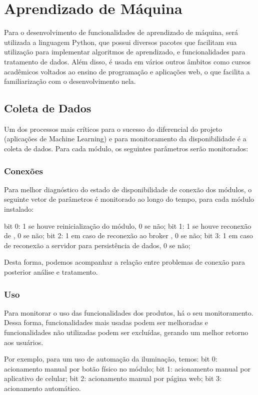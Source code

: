 \chapter{Aprendizado de Máquina}

Para o desenvolvimento de funcionalidades de aprendizado de máquina, será utilizada a linguagem Python, que possui diversos pacotes que facilitam sua utilização para implementar algoritmos de aprendizado, e funcionalidades para tratamento de dados. Além disso, é usada em vários outros âmbitos como cursos acadêmicos voltados ao ensino de programação e aplicações web, o que facilita a familiarização com o desenvolvimento nela.

\section{Coleta de Dados}
Um dos processos mais críticos para o sucesso do diferencial do projeto (aplicações de Machine Learning) e para monitoramento da disponibilidade é a coleta de dados. Para cada módulo, os seguintes parâmetros serão monitorados:

\subsection{Conexões}
Para melhor diagnóstico do estado de disponibilidade de conexão dos módulos, o seguinte vetor de parâmetros é monitorado ao longo do tempo, para cada módulo instalado:

bit 0: 1 se houve reinicialização do módulo, 0 se não;
bit 1: 1 se houve reconexão de \wwifi, 0 se não;
bit 2: 1 em caso de reconexão ao broker \wmqtt{}, 0 se não;
bit 3: 1 em caso de reconexão a servidor para persistência de dados, 0 se não;

Desta forma, podemos acompanhar a relação entre problemas de conexão para posterior análise e tratamento.

\subsection{Uso}
Para monitorar o uso das funcionalidades dos produtos, há o seu monitoramento. Dessa forma, funcionalidades mais usadas podem ser melhoradas e funcionalidades não utilizadas podem ser excluídas, gerando um melhor retorno aos usuários.

	Por exemplo, para um uso de automação da iluminação, temos:
bit 0: acionamento manual por botão físico no módulo;
bit 1: acionamento manual por aplicativo de celular;
bit 2: acionamento manual por página web;
bit 3: acionamento automático.

